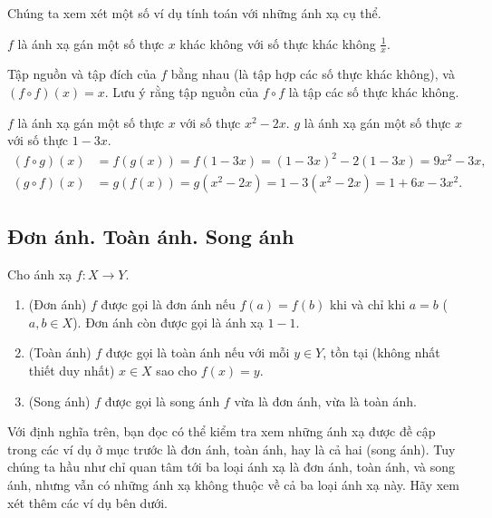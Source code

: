 Chúng ta xem xét một số ví dụ tính toán với những ánh xạ cụ thể.

\begin{example}
    $f$ là ánh xạ gán một số thực $x$ khác không với số thực khác không $\frac{1}{x}$.

    \noindent Tập nguồn và tập đích của $f$ bằng nhau (là tập hợp các số thực khác không), và $(f\circ f)(x) = x$. Lưu ý rằng tập nguồn của $f\circ f$ là tập các số thực khác không.
\end{example}

\begin{example}
    $f$ là ánh xạ gán một số thực $x$ với số thực $x^{2} - 2x$. $g$ là ánh xạ gán một số thực $x$ với số thực $1 - 3x$.
    \[
        \begin{split}
            (f\circ g)(x) &= f(g(x)) = f(1 - 3x) = {(1 - 3x)}^{2} - 2(1 - 3x) = 9{x}^{2} - 3x, \\
            (g\circ f)(x) &= g(f(x)) = g(x^{2} - 2x) = 1 - 3(x^{2} - 2x) = 1 + 6x - 3{x}^{2}.
        \end{split}
    \]
\end{example}

\subsection{Đơn ánh. Toàn ánh. Song ánh}

\begin{definition}
    Cho ánh xạ $f: X\to Y$.
    \begin{enumerate}[label={(\roman*)}]
        \item (Đơn ánh) $f$ được gọi là đơn ánh nếu $f(a) = f(b)$ khi và chỉ khi $a = b$ ($a, b\in X$). Đơn ánh còn được gọi là ánh xạ $1-1$.
        \item (Toàn ánh) $f$ được gọi là toàn ánh nếu với mỗi $y\in Y$, tồn tại (không nhất thiết duy nhất) $x\in X$ sao cho $f(x) = y$.
        \item (Song ánh) $f$ được gọi là song ánh $f$ vừa là đơn ánh, vừa là toàn ánh.
    \end{enumerate}
\end{definition}

Với định nghĩa trên, bạn đọc có thể kiểm tra xem những ánh xạ được đề cập trong các ví dụ ở mục trước là đơn ánh, toàn ánh, hay là cả hai (song ánh). Tuy chúng ta hầu như chỉ quan tâm tới ba loại ánh xạ là đơn ánh, toàn ánh, và song ánh, nhưng vẫn có những ánh xạ không thuộc về cả ba loại ánh xạ này. Hãy xem xét thêm các ví dụ bên dưới.

